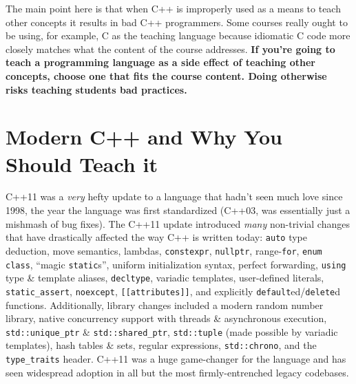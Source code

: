 \documentclass{article}
\begin{document}
 The main point here is that when C++ is improperly used as a means to teach other concepts it results in bad C++ programmers.  Some courses really ought to be using, for example, C as the teaching language because idiomatic C code more closely matches what the content of the course addresses.  \textbf{If you're going to teach a programming language as a side effect of teaching other concepts, choose one that fits the course content.  Doing otherwise risks teaching students bad practices.}

\section*{Modern C++ and Why You Should Teach it}
C++11 was a \emph{very} hefty update to a language that hadn't seen much love since 1998, the year the language was first standardized (C++03, was essentially just a mishmash of bug fixes).  The C++11 update introduced \emph{many} non-trivial changes that have drastically affected the way C++ is written today:  \lstinline{auto} type deduction, move semantics, lambdas, \lstinline{constexpr}, \lstinline{nullptr}, range-\lstinline{for}, \lstinline{enum class}, ``magic \lstinline{static}s'', uniform initialization syntax, perfect forwarding, \lstinline{using} type \& template aliases, \lstinline{decltype}, variadic templates, user-defined literals, \lstinline{static_assert}, \lstinline{noexcept}, \lstinline{[[attributes]]}, and explicitly \lstinline{default}ed/\lstinline{delete}d functions.  Additionally, library changes included a modern random number library, native concurrency support with threads \& asynchronous execution, \lstinline{std::unique_ptr} \& \lstinline{std::shared_ptr}, \lstinline{std::tuple} (made possible by variadic templates), hash tables \& sets, regular expressions, \lstinline{std::chrono}, and the \lstinline{type_traits} header.  C++11 was a huge game-changer for the language and has seen widespread adoption in all but the most firmly-entrenched legacy codebases.
\end{document}
